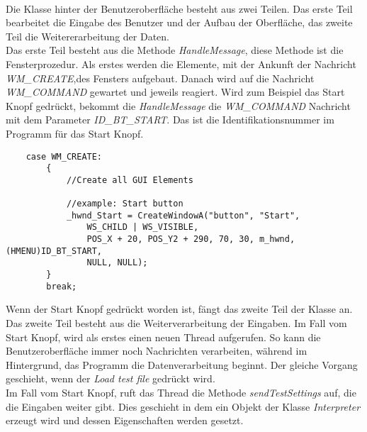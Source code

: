 \paragraph{}
Die Klasse hinter der Benutzeroberfläche besteht aus zwei Teilen. Das erste Teil bearbeitet die Eingabe des Benutzer und der Aufbau der Oberfläche, das zweite Teil die Weitererarbeitung der Daten.\\


Das erste Teil besteht aus die Methode \textit{HandleMessage}, diese Methode ist die Fensterprozedur. Als erstes werden die Elemente, mit der Ankunft der Nachricht \textit{WM\_CREATE},des Fensters aufgebaut. Danach wird auf die Nachricht \textit{WM\_COMMAND} gewartet und jeweils reagiert. Wird zum Beispiel das Start Knopf gedrückt, bekommt die \textit{HandleMessage} die \textit{WM\_COMMAND} Nachricht mit dem Parameter \textit{ID\_BT\_START}. Das ist die Identifikationsnummer im Programm für das Start Knopf.\\
\begin{lstlisting}	 
    case WM_CREATE:
        {
            //Create all GUI Elements
            
            //example: Start button
            _hwnd_Start = CreateWindowA("button", "Start",
				WS_CHILD | WS_VISIBLE,
				POS_X + 20, POS_Y2 + 290, 70, 30, m_hwnd, (HMENU)ID_BT_START,
				NULL, NULL);
        }
        break;
\end{lstlisting}

Wenn der Start Knopf gedrückt worden ist, fängt das zweite Teil der Klasse an. Das zweite Teil besteht aus die Weiterverarbeitung der Eingaben. Im Fall vom Start Knopf, wird als erstes einen neuen Thread aufgerufen. So kann die Benutzeroberfläche immer noch Nachrichten verarbeiten, während im Hintergrund, das Programm die Datenverarbeitung beginnt. Der gleiche Vorgang geschieht, wenn der \textit{Load test file} gedrückt wird.\\


Im Fall vom Start Knopf, ruft das Thread die Methode \textit{sendTestSettings} auf, die die Eingaben weiter gibt. Dies geschieht in dem ein Objekt der Klasse \textit{Interpreter} erzeugt wird und dessen Eigenschaften werden gesetzt.

